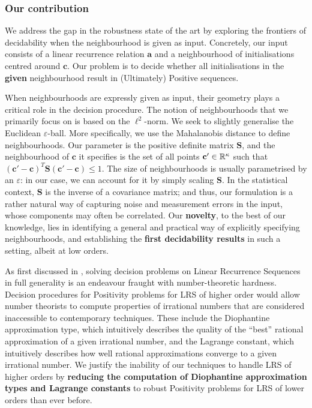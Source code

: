 \subsubsection*{Our contribution}
We address the gap in the robustness state of the art by exploring the frontiers of decidability when the neighbourhood is given as input. Concretely, our input consists of a linear recurrence relation $\mathbf{a}$ and a neighbourhood of initialisations centred around $\mathbf{c}$. Our problem is to decide whether all initialisations in the \textbf{given} neighbourhood result in (Ultimately) Positive sequences. 

When neighbourhoods are expressly given as input, their geometry plays a critical role in the decision procedure. The notion of neighbourhoods that we primarily focus on is based on the $\ell^2$-norm. We seek to slightly generalise the Euclidean $\varepsilon$-ball. More specifically, we use the Mahalanobis distance to define neighbourhoods. Our parameter is the positive definite matrix $\mathbf{S}$, and the neighbourhood of $\mathbf{c}$ it specifies is the set of all points $\mathbf{c'} \in \mathbb{R}^{\kappa}$ such that $(\mathbf{c'} - \mathbf{c})^T\mathbf{S}(\mathbf{c'} - \mathbf{c}) \le 1$. The size of neighbourhoods is usually parametrised by an $\varepsilon$: in our case, we can account for it by simply scaling $\mathbf{S}$. In the statistical context, $\mathbf{S}$ is the inverse of a covariance matrix; and thus, our formulation is a rather natural way of capturing noise and measurement errors in the input, whose components may often be correlated. Our \textbf{novelty}, to the best of our knowledge, lies in identifying a general and practical way of explicitly specifying neighbourhoods, and establishing the \textbf{first decidability results} in such a setting, albeit at low orders. 

As first discussed in \cite[Section 5]{joeljames3}, solving decision problems on Linear Recurrence Sequences in full generality is an endeavour fraught with number-theoretic hardness. Decision procedures for Positivity problems for LRS of higher order would allow number theorists to compute properties of irrational numbers that are considered inaccessible to contemporary techniques. These include the Diophantine approximation type, which intuitively describes the quality of the ``best'' rational approximation of a given irrational number, and the Lagrange constant, which intuitively describes how well rational approximations converge to a given irrational number. We justify the inability of our techniques to handle LRS of higher orders by \textbf{reducing the computation of Diophantine approximation types and Lagrange constants} to robust Positivity problems for LRS of lower orders than ever before.

